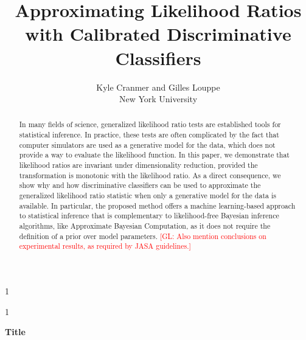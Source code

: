 \documentclass[12pt]{article}
\newcommand{\blind}{1}
\numberwithin{equation}{section}
\theoremstyle{plain}
\newcommand{\glnote}[1]{\textcolor{red}{[GL: #1]}}
\begin{document}
\def\spacingset#1{\renewcommand{\baselinestretch}%
{#1}\small\normalsize} \spacingset{1}



\blind
{
  \title{\bf Approximating Likelihood Ratios with Calibrated Discriminative Classifiers}
  \author{Kyle Cranmer and Gilles Louppe\\
          New York University}
  \maketitle
} \fi

\blind
{
  \bigskip
  \bigskip
  \bigskip
  \begin{center}
    {\LARGE\bf Title}
\end{center}
  \medskip
} \fi

\bigskip
\begin{abstract}


In many fields of science, generalized likelihood ratio tests are established tools for
statistical inference. In practice, these tests are often complicated by the fact
that computer simulators are used as a generative model for the data, which does
not provide a way to evaluate the likelihood function. In this paper, we
demonstrate that likelihood ratios are invariant under dimensionality reduction,
provided the transformation is monotonic with the likelihood ratio. As a direct
consequence, we show why and how discriminative classifiers can be used to
approximate the generalized likelihood ratio statistic when only a generative model for the data is
available. In particular, the proposed method offers a machine learning-based
approach to statistical inference that is complementary to likelihood-free
Bayesian inference algorithms, like Approximate Bayesian Computation, as it does
not require the definition of a prior over model parameters. \glnote{Also
mention conclusions on experimental results, as required by JASA guidelines.}

\end{abstract}
\end{document}
